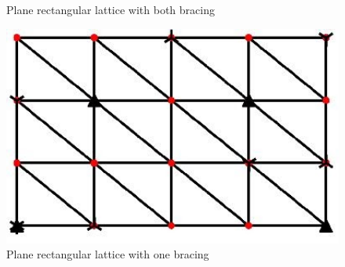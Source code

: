 \begin{figure}[htbp]
\begin{minipage}{0.3\textwidth}
    \caption{Plane rectangular lattice with both bracing}
    \label{fig:Plane_rect_with_bracing1}
\end{minipage}
\hspace{5mm}
\begin{minipage}{0.3\textwidth}
    \centering
    \includegraphics[width = 1\textwidth]{Figures/5x4_braced_plane.jpg}
    \caption{Plane rectangular lattice with one bracing}
    \label{fig:Plane_rect_with_bracing2}
\end{minipage}
\end{figure}


